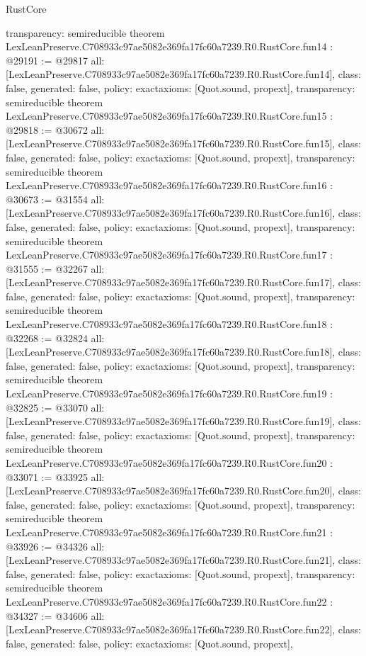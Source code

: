 \begin{lexlean}{RustCore}
\begin{coremodule}
{  transparency: semireducible
}
theorem LexLeanPreserve.C708933c97ae5082e369fa17fc60a7239.R0.RustCore.fun14 : @29191 := @29817 {
  all: [LexLeanPreserve.C708933c97ae5082e369fa17fc60a7239.R0.RustCore.fun14],
  class: false,
  generated: false,
  policy: exact{axioms: [Quot.sound, propext]},
  transparency: semireducible
}
theorem LexLeanPreserve.C708933c97ae5082e369fa17fc60a7239.R0.RustCore.fun15 : @29818 := @30672 {
  all: [LexLeanPreserve.C708933c97ae5082e369fa17fc60a7239.R0.RustCore.fun15],
  class: false,
  generated: false,
  policy: exact{axioms: [Quot.sound, propext]},
  transparency: semireducible
}
theorem LexLeanPreserve.C708933c97ae5082e369fa17fc60a7239.R0.RustCore.fun16 : @30673 := @31554 {
  all: [LexLeanPreserve.C708933c97ae5082e369fa17fc60a7239.R0.RustCore.fun16],
  class: false,
  generated: false,
  policy: exact{axioms: [Quot.sound, propext]},
  transparency: semireducible
}
theorem LexLeanPreserve.C708933c97ae5082e369fa17fc60a7239.R0.RustCore.fun17 : @31555 := @32267 {
  all: [LexLeanPreserve.C708933c97ae5082e369fa17fc60a7239.R0.RustCore.fun17],
  class: false,
  generated: false,
  policy: exact{axioms: [Quot.sound, propext]},
  transparency: semireducible
}
theorem LexLeanPreserve.C708933c97ae5082e369fa17fc60a7239.R0.RustCore.fun18 : @32268 := @32824 {
  all: [LexLeanPreserve.C708933c97ae5082e369fa17fc60a7239.R0.RustCore.fun18],
  class: false,
  generated: false,
  policy: exact{axioms: [Quot.sound, propext]},
  transparency: semireducible
}
theorem LexLeanPreserve.C708933c97ae5082e369fa17fc60a7239.R0.RustCore.fun19 : @32825 := @33070 {
  all: [LexLeanPreserve.C708933c97ae5082e369fa17fc60a7239.R0.RustCore.fun19],
  class: false,
  generated: false,
  policy: exact{axioms: [Quot.sound, propext]},
  transparency: semireducible
}
theorem LexLeanPreserve.C708933c97ae5082e369fa17fc60a7239.R0.RustCore.fun20 : @33071 := @33925 {
  all: [LexLeanPreserve.C708933c97ae5082e369fa17fc60a7239.R0.RustCore.fun20],
  class: false,
  generated: false,
  policy: exact{axioms: [Quot.sound, propext]},
  transparency: semireducible
}
theorem LexLeanPreserve.C708933c97ae5082e369fa17fc60a7239.R0.RustCore.fun21 : @33926 := @34326 {
  all: [LexLeanPreserve.C708933c97ae5082e369fa17fc60a7239.R0.RustCore.fun21],
  class: false,
  generated: false,
  policy: exact{axioms: [Quot.sound, propext]},
  transparency: semireducible
}
theorem LexLeanPreserve.C708933c97ae5082e369fa17fc60a7239.R0.RustCore.fun22 : @34327 := @34606 {
  all: [LexLeanPreserve.C708933c97ae5082e369fa17fc60a7239.R0.RustCore.fun22],
  class: false,
  generated: false,
  policy: exact{axioms: [Quot.sound, propext]},
}
\end{coremodule}
\end{lexlean}

